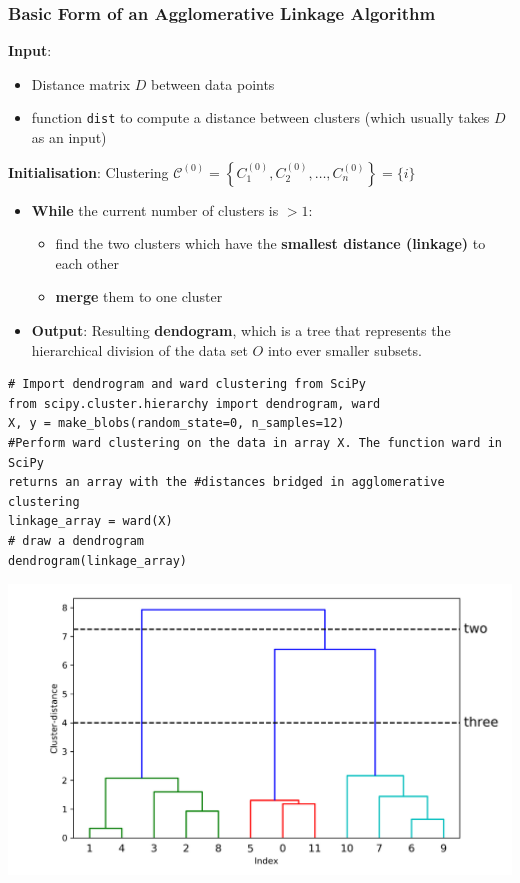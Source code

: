 \documentclass[11pt]{article}
\theoremstyle{definition}
\begin{document}
\subsubsection{Basic Form of an Agglomerative Linkage Algorithm}
\textbf{Input}:
\begin{itemize}[nosep]
	\item Distance matrix $D$ between data points
	\item function \texttt{dist} to compute a distance between clusters (which usually takes $D$ as an input)
\end{itemize}
\textbf{Initialisation}: Clustering $\mathcal{C}^{(0)} = \left\{ C_1^{(0)}, C_2^{(0)},\dots, C_n^{(0)} \right\} = \{i\}$
\begin{itemize}
	\item \textbf{While} the current number of clusters is $>1$:
	\begin{itemize}[nosep]
		\item find the two clusters which have the \textbf{smallest distance (linkage)} to each other
		\item \textbf{merge} them to one cluster
	\end{itemize}
	\item \textbf{Output}: Resulting \textbf{dendogram}, which is a tree that represents the hierarchical division of the data set $O$ into ever smaller subsets.
\end{itemize}

\begin{verbatim}
# Import dendrogram and ward clustering from SciPy
from scipy.cluster.hierarchy import dendrogram, ward
X, y = make_blobs(random_state=0, n_samples=12)
#Perform ward clustering on the data in array X. The function ward in SciPy
returns an array with the #distances bridged in agglomerative clustering
linkage_array = ward(X)
# draw a dendrogram
dendrogram(linkage_array)
\end{verbatim}
\begin{center}
	\includegraphics[width=0.7\linewidth]{img/dendrogram}
\end{center}
\end{document}

